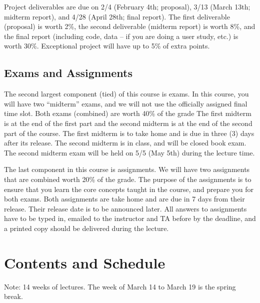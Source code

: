 \documentclass[11pt]{article}
\begin{document}
 Project deliverables are due on  2/4 (February 4th; proposal), 3/13 (March 13th; midterm report), and 4/28 (April 28th; final report). The first deliverable (proposal) is worth 2\%, the second deliverable (midterm report) is worth 8\%, and the final report (including code, data -- if you are doing a user study, etc.) is worth 30\%. Exceptional project will have up to 5\% of extra points.

\subsection{Exams and Assignments}
The second largest component (tied) of this course is exams. In this course, you will have two ``midterm'' exams, and we will not use the officially assigned final time slot. Both exams (combined) are worth 40\% of the grade The first midterm is at the end of the first part and the second midterm is at the end of the second part of the course. The first midterm is to take home and is due in three (3) days after its release. The second midterm is in class, and will be closed book exam. The second midterm exam will be held on 5/5 (May 5th) during the lecture time. 

The last component in this course is assignments. We will have two assignments that are combined worth 20\% of the grade. The purpose of the assignments is to ensure that you learn the core concepts taught in the course, and prepare you for both exams. Both assignments are take home and are due in 7 days from their release. Their release date is to be announced later. All answers to assignments have to be typed in, emailed to the instructor and TA before by the deadline, and a printed copy should be delivered during the lecture. 




\section{Contents and Schedule}

Note: 14 weeks of lectures. The week of March 14 to March 19 is the spring break. 

\end{document}
